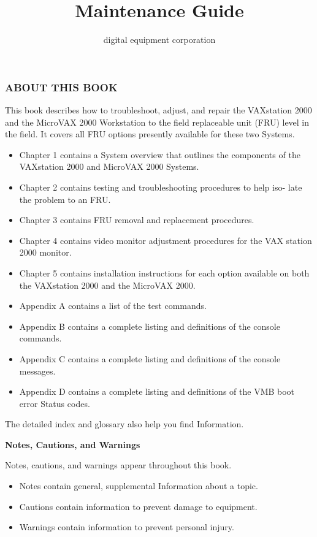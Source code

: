 \documentclass{decsectional}
\title{Maintenance Guide}
\author{digital equipment corporation}
\begin{document}
\maketitle
\toc

\newpage
\pagestyle{preface}


\subsubsection*{ABOUT THIS BOOK}

This book describes how to troubleshoot, adjust, and repair the VAXstation
2000 and the MicroVAX 2000 Workstation to the field replaceable unit (FRU)
level in the field. It covers all FRU options presently available for these two
Systems.

\begin{itemize}
\item Chapter 1 contains a System overview that outlines the components of
the VAXstation 2000 and MicroVAX 2000 Systems.
\item Chapter 2 contains testing and troubleshooting procedures to help iso-
late the problem to an FRU.
\item Chapter 3 contains FRU removal and replacement procedures.
\item Chapter 4 contains video monitor adjustment procedures for the VAX
station 2000 monitor.
\item Chapter 5 contains installation instructions for each option available on
both the VAXstation 2000 and the MicroVAX 2000.
\item Appendix A contains a list of the test commands.
\item Appendix B contains a complete listing and definitions of the console
commands.
\item Appendix C contains a complete listing and definitions of the console
messages.
\item Appendix D contains a complete listing and definitions of the VMB boot
error Status codes.
\end{itemize}

The detailed index and glossary also help you find Information.

\textbf{Notes, Cautions, and Warnings}

Notes, cautions, and warnings appear throughout this book.

\begin{itemize}
\item Notes contain general, supplemental Information about a topic.
\item Cautions contain information to prevent damage to equipment.
\item Warnings contain information to prevent personal injury.
\end{itemize}
\newpage
\end{document}
